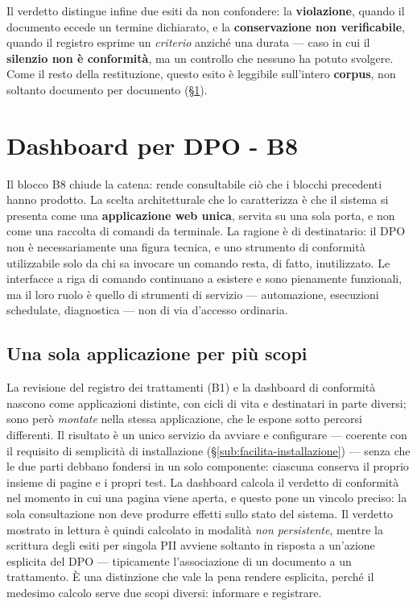 Il verdetto distingue infine due esiti da non confondere: la \textbf{violazione}, quando il documento eccede un termine dichiarato, e la \textbf{conservazione non verificabile}, quando il registro esprime un \emph{criterio} anziché una durata --- caso in cui il \textbf{silenzio non è conformità}, ma un controllo che nessuno ha potuto svolgere. Come il resto della restituzione, questo esito è leggibile sull'intero \textbf{corpus}, non soltanto documento per documento (§\ref{sec:b8-dashboard}).

\section{Dashboard per DPO - B8}
\label{sec:b8-dashboard}

Il blocco B8 chiude la catena: rende consultabile ciò che i blocchi precedenti hanno prodotto. La scelta architetturale che lo caratterizza è che il sistema si presenta come una \textbf{applicazione web unica}, servita su una sola porta, e non come una raccolta di comandi da terminale. La ragione è di destinatario: il DPO non è necessariamente una figura tecnica, e uno strumento di conformità utilizzabile solo da chi sa invocare un comando resta, di fatto, inutilizzato. Le interfacce a riga di comando continuano a esistere e sono pienamente funzionali, ma il loro ruolo è quello di strumenti di servizio --- automazione, esecuzioni schedulate, diagnostica --- non di via d'accesso ordinaria.

\subsection{Una sola applicazione per più scopi}
La revisione del registro dei trattamenti (B1) e la dashboard di conformità nascono come applicazioni distinte, con cicli di vita e destinatari in parte diversi; sono però \emph{montate} nella stessa applicazione, che le espone sotto percorsi differenti. Il risultato è un unico servizio da avviare e configurare --- coerente con il requisito di semplicità di installazione (§\ref{sub:facilita-installazione}) --- senza che le due parti debbano fondersi in un solo componente: ciascuna conserva il proprio insieme di pagine e i propri test. \medskip
La dashboard calcola il verdetto di conformità nel momento in cui una pagina viene aperta, e questo pone un vincolo preciso: la sola consultazione non deve produrre effetti sullo stato del sistema. Il verdetto mostrato in lettura è quindi calcolato in modalità \emph{non persistente}, mentre la scrittura degli esiti per singola PII avviene soltanto in risposta a un'azione esplicita del DPO --- tipicamente l'associazione di un documento a un trattamento. È una distinzione che vale la pena rendere esplicita, perché il medesimo calcolo serve due scopi diversi: informare e registrare.

